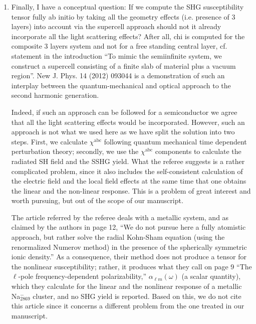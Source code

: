 \documentclass[11pt]{article}
\begin{document}
\begin{enumerate}
\item
Finally, I have a conceptual question: If we compute the SHG susceptibility
tensor fully ab initio by taking all the geometry effects (i.e. presence of 3
layers) into account via the supercell approach should not it already
incorporate all the light scattering effects? After all, chi is computed for the
composite 3 layers system and not for a free standing central layer, cf.
statement in the introduction ``To mimic the semiinfinite system, we construct a
supercell consisting of a finite slab of material plus a vacuum region''. New J.
Phys. 14 (2012) 093044 is a demonstration of such an interplay between the
quantum-mechanical and optical approach to the second harmonic generation.
\begin{shaded}
Indeed, if such an approach can be followed for a semiconductor we agree that
all the light scattering effects would be incorporated. However, such an
approach is not what we used here as we have split the solution into two steps.
First, we calculate $\chi^{\mathrm{abc}}$ following quantum mechanical time
dependent perturbation theory; secondly, we use the $\chi^{\mathrm{abc}}$
components to calculate the radiated SH field and the SSHG yield. What the
referee suggests is a rather complicated problem, since it also includes the
self-consistent calculation of the electric field and the local field effects at
the same time that one obtains the linear and the non-linear response. This is a
problem of great interest and worth pursuing, but out of the scope of our
manuscript.

The article referred by the referee deals with a metallic system, and as claimed
by the authors in page 12, ``We do not pursue here a fully atomistic approach,
but rather solve the radial Kohn-Sham equation (using the renormalized Numerov
method) in the presence of the spherically symmetric ionic density.'' As a
consequence, their method does not produce a tensor for the nonlinear
susceptibility; rather, it produces what they call on page 9 ``The $\ell$-pole
frequency-dependent polarizability,'' $\alpha_{\ell  m}(\omega)$ (a scalar
quantity), which they calculate for the linear and the nonlinear
response of a metallic Na$^{-}_{2869}$ cluster, and no SHG yield is reported.
Based on this, we do not cite this article since it concerns a different
problem from the one treated in our manuscript.
\end{shaded}

\end{enumerate}
\end{document}
